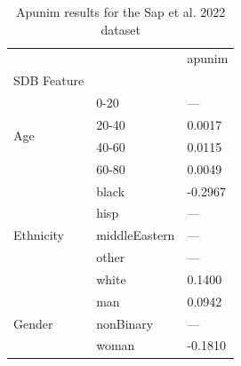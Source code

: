 \begin{table}[t]
\caption{Apunim results for the Sap et al. 2022 dataset}
\label{tab:sap_apunim_only}
\begin{tabular}{lll}
\toprule
 &  & apunim \\
SDB Feature &  &  \\
\midrule
\multirow[t]{4}{*}{Age} & 0-20 & --- \\
 & 20-40 & 0.0017 \\
 & 40-60 & 0.0115 \\
 & 60-80 & 0.0049 \\
\cline{1-3}
\multirow[t]{5}{*}{Ethnicity} & black & -0.2967 \\
 & hisp & --- \\
 & middleEastern & --- \\
 & other & --- \\
 & white & 0.1400 \\
\cline{1-3}
\multirow[t]{3}{*}{Gender} & man & 0.0942 \\
 & nonBinary & --- \\
 & woman & -0.1810 \\
\cline{1-3}
\bottomrule
\end{tabular}
\end{table}
